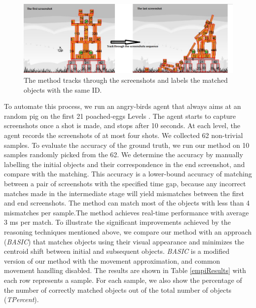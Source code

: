 \documentclass[letterpaper]{article}
\begin{document}
\begin{figure}[t]
\centering\includegraphics[scale=0.25]{TrackingBackup.png}\caption{The method tracks through the screenshots and labels the matched objects with the same ID.} %
\label{Tracking}
\vspace{-6mm}
\end{figure}

To automate this process, we run an angry-birds agent that always aims at an random pig on the first 21 poached-eggs Levels \cite{abGame}. The agent starts to capture screenshots once a shot is made, and stops after 10 seconds. At each level, the agent records the screenshots of at most four shots. We collected 62 non-trivial samples. To evaluate the accuracy of the ground truth, we run our method on 10 samples randomly picked from the 62. We determine the accuracy by manually labelling the initial objects and their correspondence in the end screenshot, and compare with the matching. This accuracy is a lower-bound accuracy of matching between a pair of screenshots with the specified time gap, because any incorrect matches made in the intermediate stage will yield mismatches between the first and end screenshots.  
The method can match most of the objects with less than 4 mismatches per sample.The method achieves real-time performance with average 3 ms per match. To illustrate the significant improvements achieved by the reasoning techniques mentioned above, we compare our method with an approach (\emph{BASIC}) that matches objects using their visual appearance and minimizes the centroid shift between initial and subsequent objects. \emph{BASIC} is a modified version of our method with the movement approximation, and common movement handling disabled. The results are shown in Table \ref{empiResults} with each row represents a sample. For each sample, we also show the percentage of the number of correctly matched objects out of the total number of objects (\emph{TPercent}).
\end{document}
